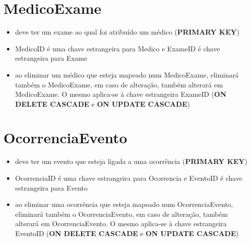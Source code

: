 \documentclass[article, a4paper, 12pt, oneside]{memoir}
\begin{document}
\section*{MedicoExame}
\begin{itemize}
	\item deve ter um exame ao qual foi atribuído um médico (\textbf{PRIMARY KEY})
	\item MedicoID é uma chave estrangeira para Medico e ExameID é chave estrangeira para Exame
	\item ao eliminar um médico que esteja mapeado num MedicoExame, eliminará também o MedicoExame, em caso de alteração, também alterará em MedicoExame. O mesmo aplica-se à chave estrangeira ExameID (\textbf{ON DELETE CASCADE} e \textbf{ON UPDATE CASCADE})
\end{itemize}

\section*{OcorrenciaEvento}
\begin{itemize}
	\item deve ter um evento que esteja ligada a uma ocorrência (\textbf{PRIMARY KEY})
	\item OcorrenciaID é uma chave estrangeira para Ocorrencia e EventoID é chave estrangeira para Evento
	\item ao eliminar uma ocorrência que esteja mapeado num OcorrenciaEvento, eliminará também o OcorrenciaEvento, em caso de alteração, também alterará em OcorrenciaEvento. O mesmo aplica-se à chave estrangeira EventoID (\textbf{ON DELETE CASCADE} e \textbf{ON UPDATE CASCADE})
\end{itemize}
\end{document}

